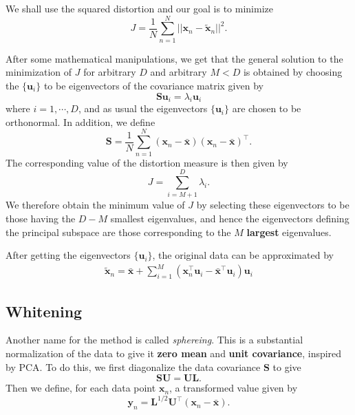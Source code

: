 \documentclass[a4paper]{book}
\renewcommand{\bf}{\mathbf}
\newcommand{\imp}[1]{\textit{#1}}
\begin{document}
We shall use the squared distortion and our goal is to minimize
\begin{equation}
	J = \frac{1}{N} \sum_{n=1}^N ||\bf{x}_n-\tilde{\bf{x}}_n||^2.
\end{equation}

After some mathematical manipulations, we get that the general solution to the minimization of $J$ for arbitrary $D$ and arbitrary $M < D$ is obtained by choosing the $\{ \bf{u}_i \}$ to be eigenvectors of the covariance matrix given by
\begin{equation}
	\bf{S} \bf{u}_i = \lambda_i \bf{u}_i
\end{equation}
where $i=1,\cdots,D$, and as usual the eigenvectors $\{ \bf{u}_i \}$ are chosen to be orthonormal. In addition, we define
\begin{equation}
	 \bf{S} = \frac{1}{N} \sum_{n=1}^N (\bf{x}_n-\bar{\bf{x}})(\bf{x}_n-\bar{\bf{x}})^{\intercal}.
\end{equation}
The corresponding value of the distortion measure is then given by
\begin{equation}
	J = \sum_{i=M+1}^D \lambda_i.
\end{equation}
We therefore obtain the minimum value of $J$ by selecting these eigenvectors to be those having the $D-M$ smallest eigenvalues, and hence the eigenvectors defining the principal subspace are those corresponding to the $M$ \textbf{largest} eigenvalues.

After getting the eigenvectors $\{ \bf{u}_i \}$, the original data can be approximated by
\begin{align}
	\tilde{\bf{x}}_n = \bar{\bf{x}} + \sum_{i=1}^M (\bf{x}_n^{\intercal} \bf{u}_i - \bar{\bf{x}}^{\intercal} \bf{u}_i)\bf{u}_i
\end{align}

\subsection{Whitening}
Another name for the method is called \imp{sphereing}. This is a substantial normalization of the data to give it \textbf{zero mean} and \textbf{unit covariance}, inspired by PCA. To do this, we first diagonalize the data covariance $\bf{S}$ to give
\begin{equation}
	\bf{SU} = \bf{UL}.
\end{equation}
Then we define, for each data point $\bf{x}_n$, a transformed value given by
\begin{equation}
	\bf{y}_n = \bf{L}^{1/2}\bf{U}^{\intercal} (\bf{x}_n - \bar{\bf{x}}).
\end{equation}
\end{document}
